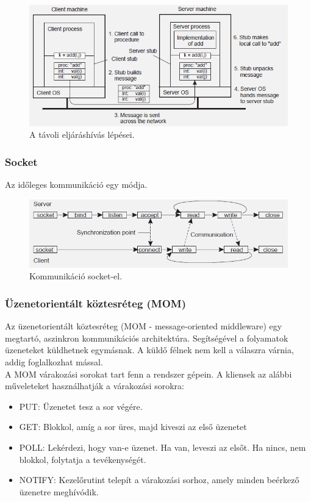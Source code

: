 \documentclass[12pt]{article}
\begin{document}
	\begin{figure}[H]
		\centering
		\includegraphics[width=0.8\linewidth]{img/rpc}
		\caption{A távoli eljáráshívás lépései.}
		\label{fig:rpc}
	\end{figure}
	
	\subsubsection{Socket}
	
	Az időleges kommunikáció egy módja.
	
	\begin{figure}[H]
		\centering
		\includegraphics[width=0.8\linewidth]{img/socket}
		\caption{Kommunikáció socket-el.}
		\label{fig:socket}
	\end{figure}
	
	\subsubsection{Üzenetorientált köztesréteg (MOM)}
	
	Az üzenetorientált köztesréteg (MOM - message-oriented middleware) egy megtartó, aszinkron kommunikációs architektúra.
	Segítségével a folyamatok üzeneteket küldhetnek egymásnak. A küldő félnek nem kell a válaszra várnia, addig
	foglalkozhat mással.\\
	
	\noindent A MOM várakozási sorokat tart fenn a rendszer gépein. A kliensek az alábbi műveleteket
	használhatják a várakozási sorokra:
	
	\begin{itemize}
		\item	PUT: Üzenetet tesz a sor végére.
		\item	GET: Blokkol, amíg a sor üres, majd kiveszi az első üzenetet
		\item	POLL: Lekérdezi, hogy van-e üzenet. Ha van, leveszi az elsőt.
		Ha nincs, nem blokkol, folytatja a tevékenységét.
		\item	NOTIFY: Kezelőrutint telepít a várakozási sorhoz, amely minden
		beérkező üzenetre meghívódik.
	\end{itemize}
	
\end{document}
